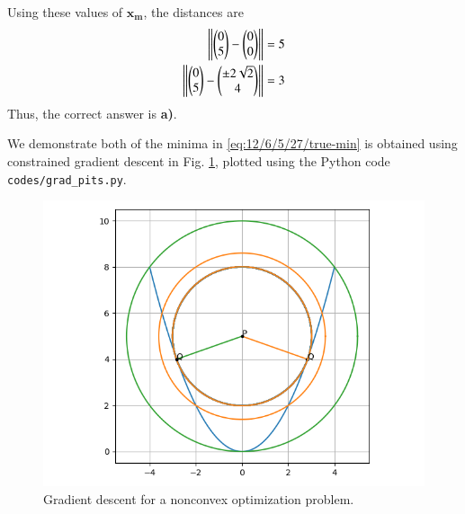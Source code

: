 \documentclass[journal,12pt,twocolumn]{IEEEtran}
\renewcommand{\vec}[1]{\boldsymbol{\mathbf{#1}}}
\begin{document}
    Using these values of $\vec{x_m}$, the distances are
    \begin{align}
        \left\Vert\begin{pmatrix}0\\5\end{pmatrix}-\begin{pmatrix}0\\0\end{pmatrix}\right\Vert &= 5 \\
        \left\Vert\begin{pmatrix}0\\5\end{pmatrix}-\begin{pmatrix}\pm 2\sqrt{2}\\4\end{pmatrix}\right\Vert &= 3
        \label{eq:12/6/5/27/true-min}
    \end{align}
    Thus, the correct answer is \textbf{a)}.

    We demonstrate both of the minima in \eqref{eq:12/6/5/27/true-min} is obtained using 
    constrained gradient descent in Fig. \ref{fig:12/6/5/27/gd-pits}, plotted using the 
    Python code \texttt{codes/grad\_pits.py}.
    \begin{figure}[!ht]
        \centering
        \includegraphics[width=\columnwidth]{12/6/5/27/figs/grad_pits.png}
        \caption{Gradient descent for a nonconvex optimization problem.}
        \label{fig:12/6/5/27/gd-pits}
    \end{figure}
\end{document}
